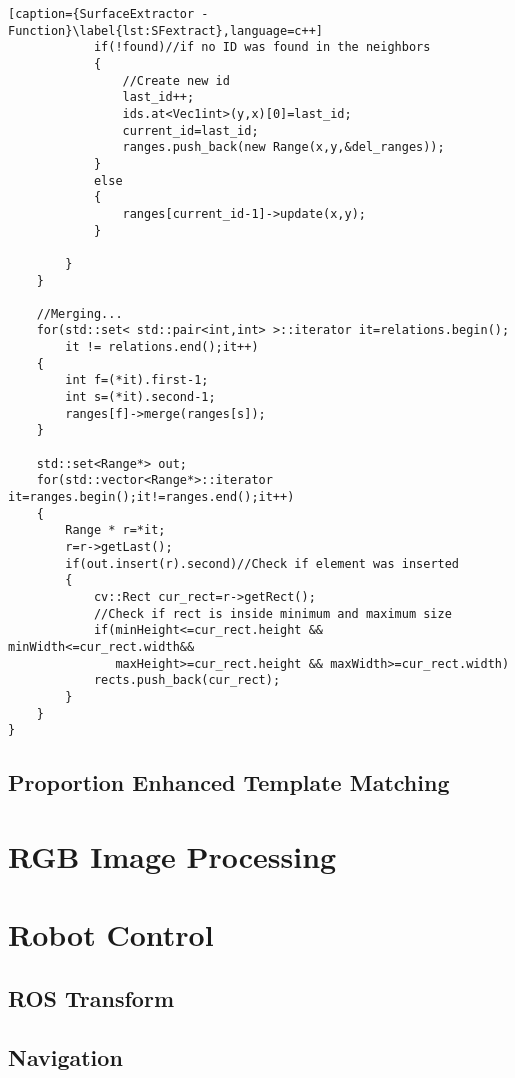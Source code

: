 \begin{lstlisting}[caption={SurfaceExtractor - Function}\label{lst:SFextract},language=c++]
			if(!found)//if no ID was found in the neighbors
			{
				//Create new id
				last_id++;
				ids.at<Vec1int>(y,x)[0]=last_id;
				current_id=last_id;
				ranges.push_back(new Range(x,y,&del_ranges));
			}
			else
			{
				ranges[current_id-1]->update(x,y);
			}

		}
	}

	//Merging...
	for(std::set< std::pair<int,int> >::iterator it=relations.begin(); 
	    it != relations.end();it++)
	{
		int f=(*it).first-1;
		int s=(*it).second-1;
		ranges[f]->merge(ranges[s]);
	}

	std::set<Range*> out;
	for(std::vector<Range*>::iterator it=ranges.begin();it!=ranges.end();it++)
	{
		Range * r=*it;
		r=r->getLast();
		if(out.insert(r).second)//Check if element was inserted
		{
			cv::Rect cur_rect=r->getRect();
			//Check if rect is inside minimum and maximum size
			if(minHeight<=cur_rect.height && minWidth<=cur_rect.width&&
			   maxHeight>=cur_rect.height && maxWidth>=cur_rect.width)
			rects.push_back(cur_rect);
		}
	}
}

\end{lstlisting}





\subsection{Proportion Enhanced Template Matching}


% 
% 
% 
% 
% 
% 
% 

\section{RGB Image Processing}


\section{Robot Control}
\subsection{ROS Transform}
\subsection{Navigation}
